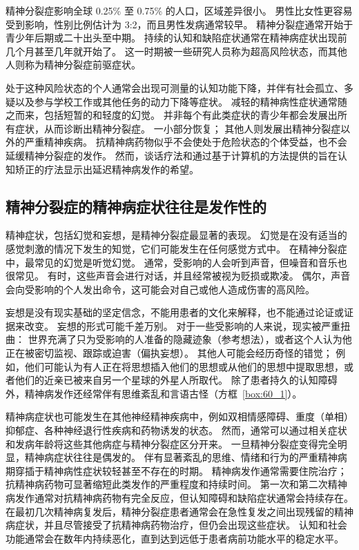 精神分裂症影响全球 0.25\% 至 0.75\% 的人口，区域差异很小。
男性比女性更容易受到影响，性别比例估计为 3:2，而且男性发病通常较早。
精神分裂症通常开始于青少年后期或二十出头至中期。
持续的认知和缺陷症状通常在精神病症状出现前几个月甚至几年就开始了。
这一时期被一些研究人员称为超高风险状态，而其他人则称为精神分裂症前驱症状。


处于这种风险状态的个人通常会出现可测量的认知功能下降，并伴有社会孤立、多疑以及参与学校工作或其他任务的动力下降等症状。
减轻的精神病性症状通常随之而来，包括短暂的和轻度的幻觉。
并非每个有此类症状的青少年都会发展出所有症状，从而诊断出精神分裂症。
一小部分恢复；
其他人则发展出精神分裂症以外的严重精神疾病。
抗精神病药物似乎不会使处于危险状态的个体受益，也不会延缓精神分裂症的发作。
然而，谈话疗法和通过基于计算机的方法提供的旨在认知矫正的疗法显示出延迟精神病发作的希望。



\subsection{精神分裂症的精神病症状往往是发作性的}

精神症状，包括幻觉和妄想，是精神分裂症最显著的表现。
幻觉是在没有适当的感觉刺激的情况下发生的知觉，它们可能发生在任何感觉方式中。
在精神分裂症中，最常见的幻觉是听觉幻觉。
通常，受影响的人会听到声音，但噪音和音乐也很常见。
有时，这些声音会进行对话，并且经常被视为贬损或欺凌。
偶尔，声音会向受影响的个人发出命令，这可能会对自己或他人造成伤害的高风险。


妄想是没有现实基础的坚定信念，不能用患者的文化来解释，也不能通过论证或证据来改变。
妄想的形式可能千差万别。 对于一些受影响的人来说，现实被严重扭曲：
世界充满了只为受影响的人准备的隐藏迹象（参考想法），或者这个人认为他正在被密切监视、跟踪或迫害（偏执妄想）。
其他人可能会经历奇怪的错觉；
例如，他们可能认为有人正在将思想插入他们的思想或从他们的思想中提取思想，或者他们的近亲已被来自另一个星球的外星人所取代。
除了患者持久的认知障碍外，精神病发作还经常伴有思维紊乱和言语古怪（方框~\ref{box:60_1}）。


精神病症状也可能发生在其他神经精神疾病中，例如双相情感障碍、重度（单相）抑郁症、各种神经退行性疾病和药物诱发的状态。
然而，通常可以通过相关症状和发病年龄将这些其他病症与精神分裂症区分开来。
一旦精神分裂症变得完全明显，精神病症状往往是偶发的。
伴有显著紊乱的思维、情绪和行为的严重精神病期穿插于精神病性症状较轻甚至不存在的时期。
精神病发作通常需要住院治疗；
抗精神病药物可显著缩短此类发作的严重程度和持续时间。
第一次和第二次精神病发作通常对抗精神病药物有完全反应，但认知障碍和缺陷症状通常会持续存在。
在最初几次精神病复发后，精神分裂症患者通常会在急性复发之间出现残留的精神病症状，并且尽管接受了抗精神病药物治疗，但仍会出现这些症状。
认知和社会功能通常会在数年内持续恶化，直到达到远低于患者病前功能水平的稳定水平。



